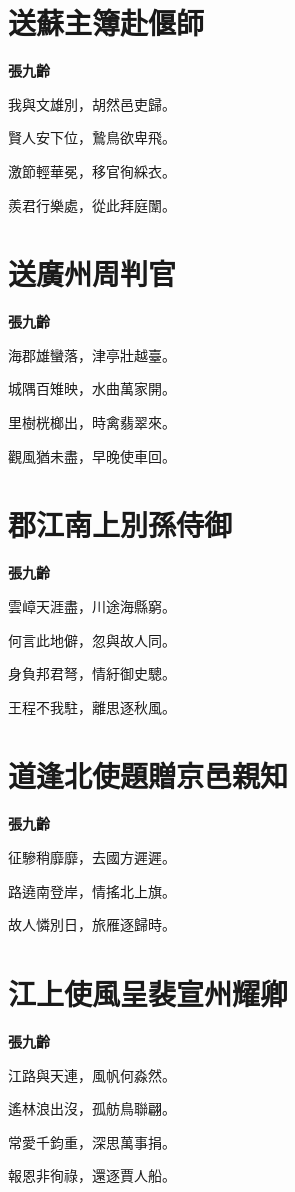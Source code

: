 \documentclass[12pt,a4paper]{ctexbook}
\begin{document}
\section{送蘇主簿赴偃師}
\textbf{張九齡}\par\vspace{0.5em}
我與文雄別，胡然邑吏歸。\par
賢人安下位，鷙鳥欲卑飛。\par
激節輕華冕，移官徇綵衣。\par
羨君行樂處，從此拜庭闈。\par

\section{送廣州周判官}
\textbf{張九齡}\par\vspace{0.5em}
海郡雄蠻落，津亭壯越臺。\par
城隅百雉映，水曲萬家開。\par
里樹桄榔出，時禽翡翠來。\par
觀風猶未盡，早晚使車回。\par

\section{郡江南上別孫侍御}
\textbf{張九齡}\par\vspace{0.5em}
雲嶂天涯盡，川途海縣窮。\par
何言此地僻，忽與故人同。\par
身負邦君弩，情紆御史驄。\par
王程不我駐，離思逐秋風。\par

\section{道逢北使題贈京邑親知}
\textbf{張九齡}\par\vspace{0.5em}
征驂稍靡靡，去國方遲遲。\par
路遶南登岸，情搖北上旗。\par
故人憐別日，旅雁逐歸時。\par

\section{江上使風呈裴宣州耀卿}
\textbf{張九齡}\par\vspace{0.5em}
江路與天連，風帆何淼然。\par
遙林浪出沒，孤舫鳥聯翩。\par
常愛千鈞重，深思萬事捐。\par
報恩非徇祿，還逐賈人船。\par
\end{document}

